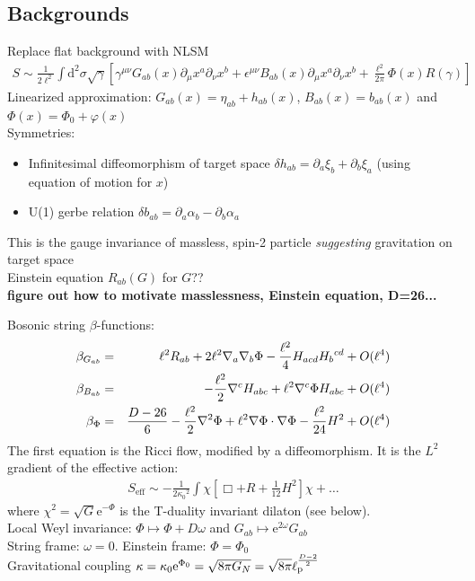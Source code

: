 \documentclass[12pt]{article}
\begin{document}
\subsection{Backgrounds}
Replace flat background with NLSM
\begin{eqnarray}
S\sim \frac 1{2\ell^2} \int \mathrm d^2\sigma \sqrt{\gamma} \left[ 
\gamma^{\mu \nu} G_{ab}(x) \partial_\mu x^a \partial_\nu x^b 
+\epsilon^{\mu \nu} B_{ab}(x) \partial_\mu x^a \partial_\nu x^b
+ \frac{\ell^2}{2\pi} \Phi(x) R(\gamma)\right]
\end{eqnarray}
Linearized approximation: $G_{ab}(x)= \eta_{ab} + h_{ab}(x)$, $B_{ab}(x)=  b_{ab}(x)$ and $\Phi(x)= \Phi_0+\varphi(x)$\\
Symmetries:
\begin{itemize}
\item Infinitesimal diffeomorphism of target space $\delta h_{ab} =\partial_a \xi_b+ \partial_b \xi_a$ (using equation of motion for $x$)
\item U(1) gerbe relation $\delta b_{ab}=\partial_a \alpha_b - \partial_b \alpha_a$
\end{itemize}
This is the gauge invariance of massless, spin-2 particle {\em suggesting} gravitation on target space\\
Einstein equation $R_{ab}(G)$ for $G$??\\

{\bf figure out how to motivate masslessness, Einstein equation, D=26...}

Bosonic string $\beta$-functions:
\begin{eqnarray}
\beta_{G_{ab}}&=& \ell^2 R_{ab}+ 2 \ell^2\nabla_a\nabla_b \Phi -\frac{\ell^2}4 H_{acd}H_b{}^{cd}+ O(\ell^4)\cr
\beta_{B_{ab}}&=& -\frac{\ell^2}2 \nabla^cH_{abc}+ \ell^2\nabla^c \Phi H_{abc} + O(\ell^4)\cr
\beta_\Phi &=& {D-26\over 6} - {\ell^2\over 2} \nabla^2 \Phi+\ell^2 \nabla\Phi \cdot \nabla \Phi -\frac{\ell^2}{24} H^2+ O(\ell^4)
\end{eqnarray}
The first equation is the Ricci flow, modified by a diffeomorphism. It is the $L^2$ gradient of the 
effective action:
\begin{eqnarray}
S_\mathrm {eff}\sim - \frac1{2{\kappa_0}^2} \int \chi \left[ \Box +R +\frac1{12}H^2\right] \chi+ \dots
\end{eqnarray}
where $\chi^2=\sqrt{G}\mathrm e^{-\Phi}$ is the T-duality invariant dilaton (see below).\\
Local Weyl invariance: $\Phi \mapsto \Phi+D\omega$ and $G_{ab}\mapsto \mathrm e^{2\omega} G_{ab}$\\
String frame: $\omega=0$. Einstein frame: $\Phi=\Phi_0$\\
Gravitational coupling $\kappa=\kappa_0 \mathrm e^{\Phi_0} = \sqrt{8\pi G_N}= \sqrt{8\pi} \ell_\mathrm p^{D-2\over 2}$
\end{document}
